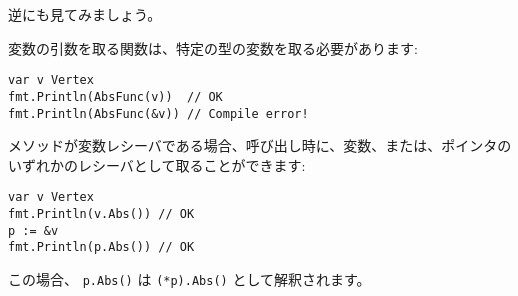逆にも見てみましょう。

変数の引数を取る関数は、特定の型の変数を取る必要があります:

\begin{lstlisting}[numbers=none]
var v Vertex
fmt.Println(AbsFunc(v))  // OK
fmt.Println(AbsFunc(&v)) // Compile error!
\end{lstlisting}

メソッドが変数レシーバである場合、呼び出し時に、変数、または、ポインタのいずれかのレシーバとして取ることができます:

\begin{lstlisting}[numbers=none]
var v Vertex
fmt.Println(v.Abs()) // OK
p := &v
fmt.Println(p.Abs()) // OK
\end{lstlisting}

この場合、 \texttt{p.Abs()} は \texttt{(*p).Abs()} として解釈されます。